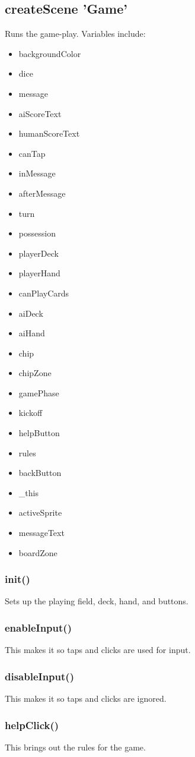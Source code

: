 \documentclass[12pt]{article}
\begin{document}
\subsection*{createScene 'Game'}
Runs the game-play. 
Variables include: 
\begin{itemize}
\item backgroundColor
\item dice 
\item message
\item aiScoreText 
\item humanScoreText
\item canTap
\item inMessage
\item afterMessage
\item turn 
\item possession
\item playerDeck
\item playerHand
\item canPlayCards
\item aiDeck
\item aiHand
\item chip
\item chipZone 
\item gamePhase 
\item kickoff
\item helpButton
\item rules 
\item backButton
\item \_this
\item activeSprite
\item messageText
\item boardZone 
\end{itemize}

\subsubsection*{init()}
Sets up the playing field, deck, hand, and buttons. 
\subsubsection*{enableInput()}
This makes it so taps and clicks are used for input. 
\subsubsection*{disableInput()}
This makes it so taps and clicks are ignored. 
\subsubsection*{helpClick()}
This brings out the rules for the game. 
\end{document}
